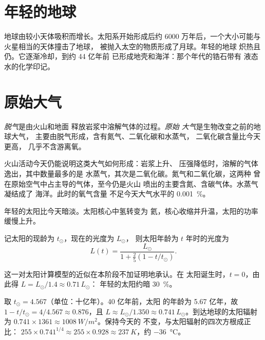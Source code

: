 \section{年轻的地球}

地球由较小天体吸积而增长。太阳系开始形成后约
6000 万年后，一个大小可能与火星相当的天体撞击了地球，
被抛入太空的物质形成了月球。年轻的地球
炽热且仍。它逐渐冷却，到约 44 亿年前
已形成地壳和海洋：那个年代的锆石带有
液态水的化学印记。

\section{原始大气}

\begin{definition}[脱气；原始大气]\label{def:g12:early-earth:primitive-atmosphere}
\emph{脱气}是由火山和地面
释放岩浆中溶解气体的过程。\emph{原始
大气}是生物改变之前的地球大气，
主要由脱气形成，含有氮气、二氧化碳和水蒸气，
二氧化碳含量比今天更高，
几乎不含游离氧。
\end{definition}

火山活动今天仍能说明这类大气如何形成：岩浆上升、
压强降低时，溶解的气体逸出，其中数量最多的是
水蒸气，其次是二氧化碳。氮气和二氧化碳，这两种
曾在原始空气中占主导的气体，至今仍是火山
喷出的主要含氮、含碳气体。水蒸气凝结成了
海洋。此时的氧气含量
不足今天大气水平的 \qty{0.001}{\percent}。

年轻的太阳比今天暗淡。太阳核心中氢转变为
氦，核心收缩并升温，太阳的功率
缓慢上升。

\begin{proposition}[年轻太阳的光度]\label{prop:g12:early-earth:luminosity}
记太阳的现龄为 $t_\odot$，现在的光度为 $L_\odot$，
则太阳年龄为 $t$ 年时的光度为
\[
  L(t) = \frac{L_\odot}{1 + \frac{2}{5}\left(1 - t/t_\odot\right)} .
\]
\end{proposition}

这一对太阳计算模型的近似在本阶段不加证明地承认。在
太阳诞生时，$t = 0$，由此得 $L = L_\odot/1.4 \approx 0.71\,L_\odot$：
年轻的太阳约暗 \qty{30}{\percent}。

\begin{example}[40 亿年前的地球]\label{ex:g12:early-earth:young-sun}
取 $t_\odot = 4.567$（单位：十亿年）。40 亿年前，太阳
的年龄为 5.67 亿年，故 $1 - t/t_\odot = 4/4.567 \approx 0.876$，且
$L \approx L_\odot/1.350 \approx 0.741\,L_\odot$。到达地球的太阳辐射
为 $0.741 \times 1361 \approx \qty{1008}{W/m^2}$。保持今天的
不变，与太阳辐射的四次方根成正比：
$255 \times 0.741^{1/4} \approx 255 \times 0.928 \approx
\qty{237}{K}$，约 \qty{-36}{\celsius}。
\end{example}

